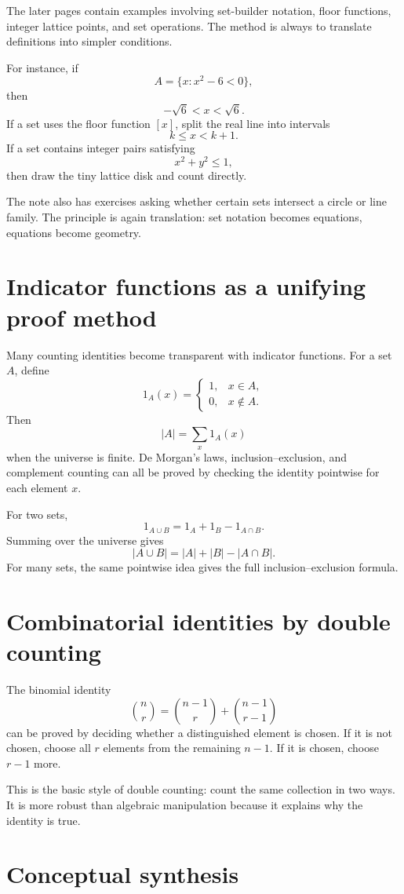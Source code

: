 The later pages contain examples involving set-builder notation, floor functions, integer lattice points, and set operations.  The method is always to translate definitions into simpler conditions.

For instance, if
\[
  A=\{x:x^2-6<0\},
\]
then
\[
  -\sqrt6<x<\sqrt6.
\]
If a set uses the floor function \([x]\), split the real line into intervals
\[
  k\le x<k+1.
\]
If a set contains integer pairs satisfying
\[
  x^2+y^2\le1,
\]
then draw the tiny lattice disk and count directly.

The note also has exercises asking whether certain sets intersect a circle or line family.  The principle is again translation: set notation becomes equations, equations become geometry.


\section{Indicator functions as a unifying proof method}

Many counting identities become transparent with indicator functions.  For a set \(A\), define
\[
  1_A(x)=\begin{cases}1,&x\in A,\\0,&x\notin A.\end{cases}
\]
Then
\[
  |A|=\sum_x1_A(x)
\]
when the universe is finite.  De Morgan's laws, inclusion--exclusion, and complement counting can all be proved by checking the identity pointwise for each element \(x\).

For two sets,
\[
  1_{A\cup B}=1_A+1_B-1_{A\cap B}.
\]
Summing over the universe gives
\[
  |A\cup B|=|A|+|B|-|A\cap B|.
\]
For many sets, the same pointwise idea gives the full inclusion--exclusion formula.

\section{Combinatorial identities by double counting}

The binomial identity
\[
  \binom n r=\binom{n-1}r+\binom{n-1}{r-1}
\]
can be proved by deciding whether a distinguished element is chosen.  If it is not chosen, choose all \(r\) elements from the remaining \(n-1\).  If it is chosen, choose \(r-1\) more.

This is the basic style of double counting: count the same collection in two ways.  It is more robust than algebraic manipulation because it explains why the identity is true.

\section{Conceptual synthesis}

